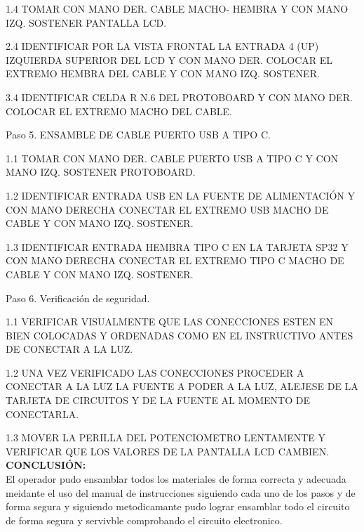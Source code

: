 1.4  TOMAR CON MANO DER. CABLE MACHO- HEMBRA Y CON MANO IZQ. SOSTENER PANTALLA LCD.





2.4  IDENTIFICAR POR LA VISTA FRONTAL LA ENTRADA 4 (UP)  IZQUIERDA SUPERIOR DEL LCD Y CON MANO DER. COLOCAR EL EXTREMO HEMBRA DEL CABLE Y CON MANO IZQ. SOSTENER.





 
3.4 IDENTIFICAR CELDA R N.6 DEL PROTOBOARD Y CON MANO DER. COLOCAR EL EXTREMO MACHO DEL CABLE.












Paso 5. ENSAMBLE DE CABLE PUERTO USB A TIPO C.

1.1	TOMAR CON MANO DER. CABLE PUERTO USB A TIPO C Y CON MANO IZQ. SOSTENER PROTOBOARD.





1.2	IDENTIFICAR ENTRADA USB EN LA FUENTE DE ALIMENTACIÓN Y CON MANO DERECHA CONECTAR EL EXTREMO USB MACHO DE CABLE Y CON MANO IZQ. SOSTENER.





1.3	IDENTIFICAR ENTRADA HEMBRA TIPO C EN LA TARJETA SP32 Y CON MANO DERECHA CONECTAR EL EXTREMO TIPO C MACHO DE CABLE Y CON MANO IZQ. SOSTENER.











Paso 6. Verificación de seguridad.

1.1	VERIFICAR VISUALMENTE QUE LAS CONECCIONES ESTEN EN BIEN COLOCADAS Y ORDENADAS COMO EN EL INSTRUCTIVO ANTES DE CONECTAR A LA LUZ.




1.2	UNA VEZ VERIFICADO LAS CONECCIONES PROCEDER A CONECTAR A LA LUZ LA FUENTE A PODER A LA LUZ, ALEJESE DE LA TARJETA DE CIRCUITOS Y DE LA FUENTE AL MOMENTO DE CONECTARLA.




1.3 MOVER LA PERILLA DEL POTENCIOMETRO LENTAMENTE Y VERIFICAR QUE LOS VALORES DE LA PANTALLA LCD CAMBIEN. \\


\textbf{CONCLUSIÓN:}
\\El operador pudo ensamblar todos los materiales de forma correcta y adecuada meidante el uso del manual de instrucciones siguiendo cada uno de los pasos y de forma segura y siguiendo metodicamante pudo lograr ensamblar todo el circuito de forma segura y servivble comprobando el circuito electronico. 



 


